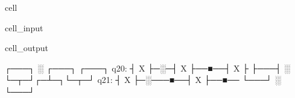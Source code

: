\documentclass[letterpaper,10pt,english]{jupyterBook}
\begin{document}
\begin{sphinxuseclass}{cell}\begin{sphinxVerbatimInput}

\begin{sphinxuseclass}{cell_input}
\begin{sphinxVerbatim}[commandchars=\\\{\}]
  
  
\PYG{p}{[}\PYG{p}{]}
\end{sphinxVerbatim}

\end{sphinxuseclass}\end{sphinxVerbatimInput}
\begin{sphinxVerbatimOutput}

\begin{sphinxuseclass}{cell_output}
\begin{sphinxVerbatim}[commandchars=\\\{\}]
      ┌───┐ ░ ┌───┐     ┌───┐
q2\PYGZus{}0: ┤ X ├─░─┤ X ├──■──┤ X ├
      ├───┤ ░ └─┬─┘┌─┴─┐└─┬─┘
q2\PYGZus{}1: ┤ X ├─░───■──┤ X ├──■──
      └───┘ ░      └───┘
\end{sphinxVerbatim}

\end{sphinxuseclass}\end{sphinxVerbatimOutput}

\end{sphinxuseclass}
\end{document}
